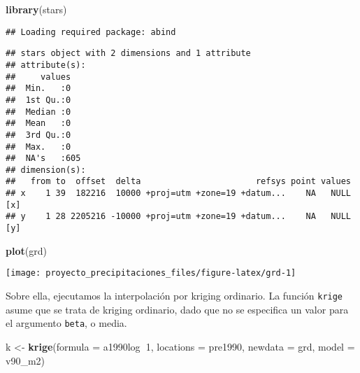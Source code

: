 \documentclass[11pt,]{article}
\newenvironment{Shaded}{\begin{snugshade}}{\end{snugshade}}
\newcommand{\KeywordTok}[1]{\textcolor[rgb]{0.13,0.29,0.53}{\textbf{#1}}}
\newcommand{\DataTypeTok}[1]{\textcolor[rgb]{0.13,0.29,0.53}{#1}}
\newcommand{\DecValTok}[1]{\textcolor[rgb]{0.00,0.00,0.81}{#1}}
\newcommand{\StringTok}[1]{\textcolor[rgb]{0.31,0.60,0.02}{#1}}
\newcommand{\CommentTok}[1]{\textcolor[rgb]{0.56,0.35,0.01}{\textit{#1}}}
\newcommand{\OperatorTok}[1]{\textcolor[rgb]{0.81,0.36,0.00}{\textbf{#1}}}
\newcommand{\NormalTok}[1]{#1}
\begin{document}
\begin{Shaded}
\begin{Highlighting}[]
\KeywordTok{library}\NormalTok{(stars)}
\end{Highlighting}
\end{Shaded}

\begin{verbatim}
## Loading required package: abind
\end{verbatim}

\begin{Shaded}
\end{Shaded}

\begin{verbatim}
## stars object with 2 dimensions and 1 attribute
## attribute(s):
##     values    
##  Min.   :0    
##  1st Qu.:0    
##  Median :0    
##  Mean   :0    
##  3rd Qu.:0    
##  Max.   :0    
##  NA's   :605  
## dimension(s):
##   from to  offset  delta                       refsys point values    
## x    1 39  182216  10000 +proj=utm +zone=19 +datum...    NA   NULL [x]
## y    1 28 2205216 -10000 +proj=utm +zone=19 +datum...    NA   NULL [y]
\end{verbatim}

\begin{Shaded}
\begin{Highlighting}[]
\KeywordTok{plot}\NormalTok{(grd)}
\end{Highlighting}
\end{Shaded}

\texttt{[image: proyecto\_precipitaciones\_files/figure-latex/grd-1]}

Sobre ella, ejecutamos la interpolación por kriging ordinario. La
función \texttt{krige} asume que se trata de kriging ordinario, dado que
no se especifica un valor para el argumento \texttt{beta}, o media.

\begin{Shaded}
\begin{Highlighting}[]
\NormalTok{k <-}\StringTok{ }\KeywordTok{krige}\NormalTok{(}\DataTypeTok{formula =}\NormalTok{ a1990log}\OperatorTok{~}\DecValTok{1}\NormalTok{, }\DataTypeTok{locations =}\NormalTok{ pre1990, }\DataTypeTok{newdata =}\NormalTok{ grd, }\DataTypeTok{model =}\NormalTok{ v90_m2)}
\end{Highlighting}
\end{Shaded}
\end{document}
